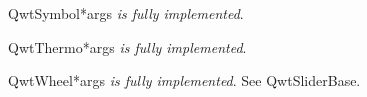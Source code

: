 \documentclass{manual}
\begin{document}
\begin{classdesc}{QwtSymbol}{*args}
\emph{is fully implemented}.
\end{classdesc}

\begin{classdesc}{QwtThermo}{*args}
\emph{is fully implemented}.
\end{classdesc}

\begin{classdesc}{QwtWheel}{*args}
\emph{is fully implemented}. See QwtSliderBase.
\end{classdesc}

\renewcommand{\indexname}{Index}

\end{document}
